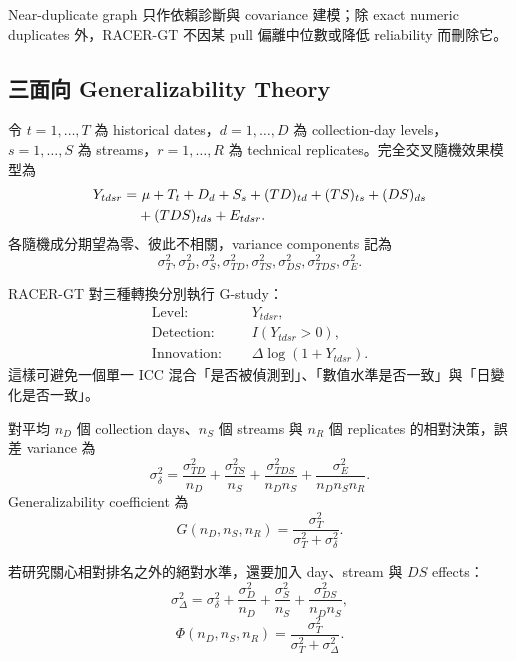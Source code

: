 \documentclass[12pt,a4paper,oneside]{article}
\begin{document}
Near-duplicate graph 只作依賴診斷與 covariance 建模；除 exact numeric duplicates 外，RACER-GT 不因某 pull 偏離中位數或降低 reliability 而刪除它。

\subsection{三面向 Generalizability Theory}

令 $t=1,\ldots,T$ 為 historical dates，$d=1,\ldots,D$ 為 collection-day levels，$s=1,\ldots,S$ 為 streams，$r=1,\ldots,R$ 為 technical replicates。完全交叉隨機效果模型為
\begin{align}
Y_{tdsr}
=&\ \mu+T_t+D_d+S_s+(TD)_{td}+(TS)_{ts}+(DS)_{ds}\notag\\
&+(TDS)_{tds}+E_{tdsr}.
\label{eq:gtheorymodel}
\end{align}
各隨機成分期望為零、彼此不相關，variance components 記為
\[
\sigma_T^2,\sigma_D^2,\sigma_S^2,\sigma_{TD}^2,
\sigma_{TS}^2,\sigma_{DS}^2,\sigma_{TDS}^2,\sigma_E^2.
\]

RACER-GT 對三種轉換分別執行 G-study：
\begin{align}
\text{Level: }&\quad Y_{tdsr},\\
\text{Detection: }&\quad I(Y_{tdsr}>0),\\
\text{Innovation: }&\quad \Delta\log(1+Y_{tdsr}).
\end{align}
這樣可避免一個單一 ICC 混合「是否被偵測到」、「數值水準是否一致」與「日變化是否一致」。

對平均 $n_D$ 個 collection days、$n_S$ 個 streams 與 $n_R$ 個 replicates 的相對決策，誤差 variance 為
\begin{equation}
\sigma_\delta^2
=\frac{\sigma_{TD}^2}{n_D}
+\frac{\sigma_{TS}^2}{n_S}
+\frac{\sigma_{TDS}^2}{n_Dn_S}
+\frac{\sigma_E^2}{n_Dn_Sn_R}.
\label{eq:relativeerror}
\end{equation}
Generalizability coefficient \cite{shavelson1991} 為
\begin{equation}
G(n_D,n_S,n_R)
=\frac{\sigma_T^2}{\sigma_T^2+\sigma_\delta^2}.
\label{eq:gcoef}
\end{equation}

若研究關心相對排名之外的絕對水準，還要加入 day、stream 與 $DS$ effects：
\begin{equation}
\sigma_\Delta^2=\sigma_\delta^2
+\frac{\sigma_D^2}{n_D}
+\frac{\sigma_S^2}{n_S}
+\frac{\sigma_{DS}^2}{n_Dn_S},
\end{equation}
\begin{equation}
\Phi(n_D,n_S,n_R)
=\frac{\sigma_T^2}{\sigma_T^2+\sigma_\Delta^2}.
\label{eq:phicoef}
\end{equation}
\end{document}
